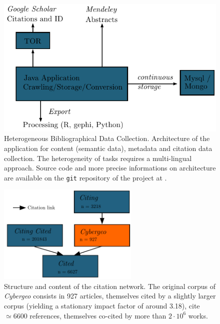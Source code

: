 \begin{figure}
\includegraphics[width=\textwidth]{figures/archi}
\caption[Heterogeneous Bibliographical Data Collection]{Heterogeneous Bibliographical Data Collection. Architecture of the application for content (semantic data), metadata and citation data collection. The heterogeneity of tasks requires a multi-lingual approach. Source code and more precise informations on architecture are available on the \texttt{git} repository of the project at \texttt{}.}
\label{fig:datacollection}
\end{figure}




\begin{figure}
\centering
\includegraphics[width=0.6\textwidth]{figures/citnw}
\caption{Structure and content of the citation network. The original corpus of \emph{Cybergeo} consists in 927 articles, themselves cited by a slightly larger corpus (yielding a stationary impact factor of around 3.18), cite $\simeq 6600$ references, themselves co-cited by more than $2\cdot 10^6$ works.}
\label{fig:citationnetwork}
\end{figure}









